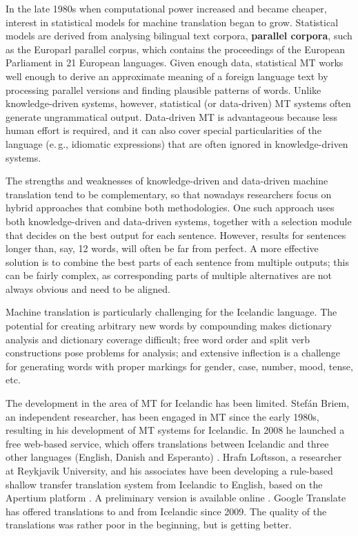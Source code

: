 \begin{multicols}{2}
In the late 1980s when computational power increased and became cheaper, interest in statistical models for machine translation began to grow. Statistical models are derived from analysing bilingual text corpora, \textbf{parallel corpora}, such as the Europarl parallel corpus, which contains the proceedings of the European Parliament in 21 European languages. Given enough data, statistical MT works well enough to derive an approximate meaning of a foreign language text by processing parallel versions and finding plausible patterns of words. Unlike knowledge-driven systems, however, statistical (or data-driven) MT systems often generate ungrammatical output. Data-driven MT is advantageous because less human effort is required, and it can also cover special particularities of the language (e.\,g., idiomatic expressions) that are often ignored in knowledge-driven systems. 

The strengths and weaknesses of knowledge-driven and data-driven machine translation tend to be complementary, so that nowadays researchers focus on hybrid approaches that combine both methodologies. One such approach uses both knowledge-driven and data-driven systems, together with a selection module that decides on the best output for each sentence. However, results for sentences longer than, say, 12 words, will often be far from perfect. A more effective solution is to combine the best parts of each sentence from multiple outputs; this can be fairly complex, as corresponding parts of multiple alternatives are not always obvious and need to be aligned. 


Machine translation is particularly challenging for the Icelandic language. The potential for creating arbitrary new words by compounding makes dictionary analysis and dictionary coverage difficult; free word order and split verb constructions pose problems for analysis; and extensive inflection is a challenge for generating words with proper markings for gender, case, number, mood, tense, etc.

The development in the area of MT for Icelandic has been limited. Stefán Briem, an independent researcher, has been engaged in MT since the early 1980s, resulting in his development of MT systems for Icelandic. In 2008 he launched a free web-based service, which offers translations between Icelandic and three other languages (English, Danish and Esperanto) \cite{tut1}. Hrafn Loftsson, a researcher at Reykjavik University, and his associates have been developing a rule-based shallow transfer translation system from Icelandic to English, based on the Apertium platform \cite{ape1}. A preliminary version is available online \cite{ape2}.  Google Translate has offered translations to and from Icelandic since 2009. The quality of the translations was rather poor in the beginning, but is getting better.


\end{multicols}
